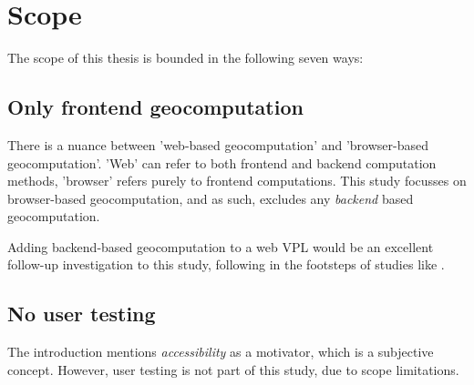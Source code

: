 
\section{Scope}
The scope of this thesis is bounded in the following seven ways: 

\subsection*{Only frontend geocomputation}

There is a nuance between 'web-based geocomputation' and 'browser-based geocomputation'. 
'Web' can refer to both frontend and backend computation methods, 'browser' refers purely to frontend computations. 
This study focusses on browser-based geocomputation, and as such, excludes any \emph {backend} based geocomputation.

Adding backend-based geocomputation to a web VPL would be an excellent 
follow-up investigation to this study, following in the footsteps of studies like \cite{panidi_hybrid_2015}. 

\subsection*{No user testing} %

The introduction mentions \emph{accessibility} as a motivator, which is a subjective concept.
However, user testing is not part of this study, due to scope limitations. 

